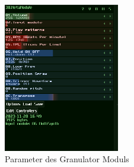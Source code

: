 \documentclass[12pt]{scrartcl}%
\theoremstyle{nonumberplain}
\begin{document}
\begin{figure}
  \centering
  \includegraphics[width=0.45\textwidth]{sunvox_3}
  \caption{Parameter des Granulator Moduls}
\end{figure}
\end{document}
